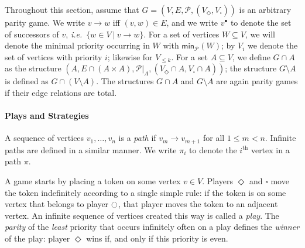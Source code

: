\documentclass{eptcs}
\renewcommand{\i}{\ensuremath{\ocircle}\xspace}
\newcommand{\odd}{\ensuremath{\square}\xspace}
\newcommand{\even}{\ensuremath{\Diamond}\xspace}
\newcommand{\post}[1]{\ensuremath{#1^{\bullet}}}
\newcommand{\minprio}[1]{\textsf{min}_{\priosym}(#1)}
\newcommand{\ie}{\emph{i.e.}\xspace}
\newcommand{\priosym}{\mathcal{P}}
\begin{document}
Throughout this section, assume that $G = (V,E,\priosym, (V_\even,
V_\odd))$ is an arbitrary parity game.  We write $v \to w$ iff
$(v,w) \in E$, and we write $\post{v}$ to denote the set of successors of
$v$, \ie\ $\{w \in V ~|~ v \to w\}$. For a set of vertices $W \subseteq V$, we will denote
the minimal priority occurring in $W$ with $\minprio{W}$; by 
$V_i$ we denote the set of vertices with priority $i$; likewise
for $V_{\le k}$.   For
a set $A \subseteq V$, we define $G \cap A$ as the structure $(A,
E \cap (A \times A), \priosym|_A, (V_\even \cap A, V_\odd \cap A))$;
the structure $G \setminus A$ is defined as $G \cap (V \setminus
A)$. The structures $G \cap A$ and $G \setminus A$ are again 
parity games if their edge relations are total. 

\paragraph*{Plays and Strategies}
A sequence of vertices $v_1, \ldots, v_n$ is a \emph{path} if $v_m \to
v_{m+1}$ for all $1 \leq m < n$.  Infinite paths are defined in a similar
manner. We write $\pi_i$ to denote the $i^\textrm{th}$ vertex in a path $\pi$.

A game starts by placing a token on some vertex $v \in V$.  Players
$\even$ and $\odd$ move the token indefinitely according to a single
simple rule: if the token is on some vertex that belongs to player
$\i$, that player moves the token to an adjacent vertex.
An infinite sequence of vertices created this way is called a
\emph{play}.  The \emph{parity} of the \emph{least} priority that occurs
infinitely often on a play defines the \emph{winner} of the play:
player $\even$ wins if, and only if this priority is even. 
\end{document}
